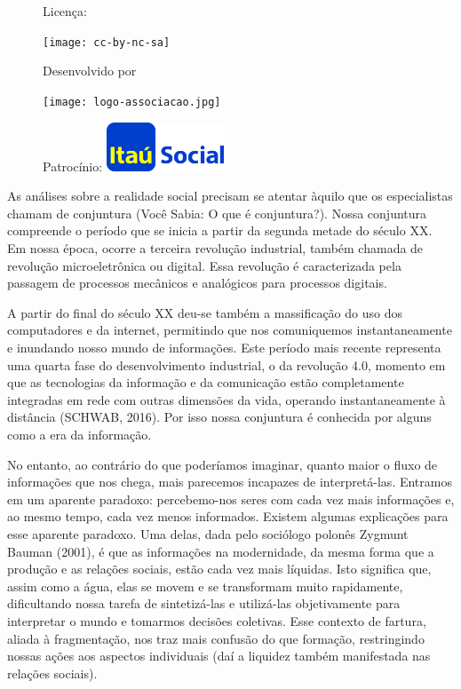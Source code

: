 \begin{figure}[b]
\begin{minipage}[l]{5cm}
\centering

{\large Licença:}

  \texttt{[image: cc-by-nc-sa]}
\end{minipage}\hfill
\begin{minipage}[c]{5cm}
\centering
{\large Desenvolvido por}

\texttt{[image: logo-associacao.jpg]}
\end{minipage}
\begin{minipage}[r]{5cm}
\centering

{\large Patrocínio:}
  \vspace{1em}
  \includegraphics[width=3.5cm]{itau}
\end{minipage}
\end{figure}

\mainmatter


As análises sobre a realidade social precisam se atentar àquilo que os especialistas chamam de conjuntura (Você Sabia: O que é conjuntura?). Nossa conjuntura compreende o período que se inicia a partir da segunda metade do século XX. Em nossa época, ocorre a terceira revolução industrial, também chamada de revolução microeletrônica ou digital. Essa revolução é caracterizada pela passagem de processos mecânicos e analógicos para processos digitais.

A partir do final do século XX deu-se também a massificação do uso dos computadores e da internet, permitindo que nos comuniquemos instantaneamente e inundando nosso mundo de informações. Este período mais recente representa uma quarta fase do desenvolvimento industrial, o da revolução 4.0, momento em que as tecnologias da informação e da comunicação estão completamente integradas em rede com outras dimensões da vida, operando instantaneamente à distância (SCHWAB, 2016). Por isso nossa conjuntura é conhecida por alguns como a era da informação.

No entanto, ao contrário do que poderíamos imaginar, quanto maior o fluxo de informações que nos chega, mais parecemos incapazes de interpretá-las. Entramos em um aparente paradoxo: percebemo-nos seres com cada vez mais informações e, ao mesmo tempo, cada vez menos informados. Existem algumas explicações para esse aparente paradoxo. Uma delas, dada pelo sociólogo polonês Zygmunt Bauman (2001), é que as informações na modernidade, da mesma forma que a produção e as relações sociais, estão cada vez mais líquidas. Isto significa que, assim como a água, elas se movem e se transformam muito rapidamente, dificultando nossa tarefa de sintetizá-las e utilizá-las objetivamente para interpretar o mundo e tomarmos decisões coletivas. Esse contexto de fartura, aliada à fragmentação, nos traz mais confusão do que formação, restringindo nossas ações aos aspectos individuais (daí a liquidez também manifestada nas relações sociais).

